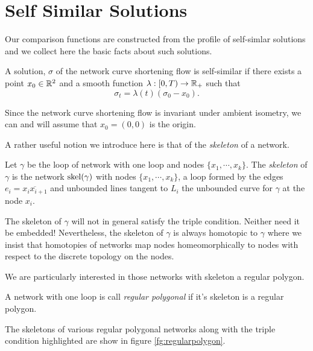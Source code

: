 \documentclass[11pt]{amsart}
\begin{document}
\section{Self Similar Solutions}
\label{sec:self_similar}

Our comparison functions are constructed from the profile of self-simlar solutions and we collect here the basic facts about such solutions.

\begin{defn}
\label{defn:self_simlar}
A solution, \(\sigma\) of the network curve shortening flow is self-similar if there exists a point \(x_0 \in \mathbb{R}^2\) and a smooth function \(\lambda : [0, T) \to \mathbb{R}_+\) such that
\[
\sigma_t = \lambda(t) (\sigma_0 - x_0).
\]
\end{defn}
Since the network curve shortening flow is invariant under ambient isometry, we can and will assume that \(x_0 = (0, 0)\) is the origin.

A rather useful notion we introduce here is that of the \emph{skeleton} of a network.

\begin{defn}
\label{defn:skeleton}
Let \(\gamma\) be the loop of network with one loop and nodes \(\{x_1, \cdots, x_k\}\). The \emph{skeleton} of \(\gamma\) is the network \(\operatorname{skel}({\gamma})\) with nodes \(\{x_1, \cdots, x_k\}\), a loop formed by the edges \(e_i = \overline{x_ix_{i+1}}\) and unbounded lines tangent to \(L_i\) the unbounded curve for \(\gamma\) at the node \(x_i\).
\end{defn}

\begin{remark}
The skeleton of \(\gamma\) will not in general satisfy the triple condition. Neither need it be embedded! Nevertheless, the skeleton of \(\gamma\) is always homotopic to \(\gamma\) where we insist that homotopies of networks map nodes homeomorphically to nodes with respect to the discrete topology on the nodes.
\end{remark}

We are particularly interested in those networks with skeleton a regular polygon.

\begin{defn}
A network with one loop is call \emph{regular polygonal} if it's skeleton is a regular polygon.
\end{defn}

The skeletons of various regular polygonal networks along with the triple condition highlighted are show in figure \ref{fg:regularpolygon}.
\end{document}
